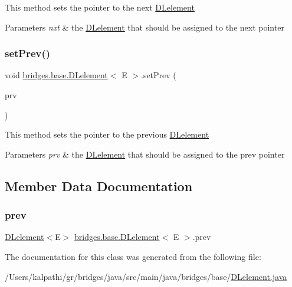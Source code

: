 This method sets the pointer to the next \mbox{\hyperlink{classbridges_1_1base_1_1_d_lelement}{D\+Lelement}}


\begin{DoxyParams}{Parameters}
{\em nxt} & the \mbox{\hyperlink{classbridges_1_1base_1_1_d_lelement}{D\+Lelement}} that should be assigned to the next pointer \\
\hline
\end{DoxyParams}
\mbox{\label{classbridges_1_1base_1_1_d_lelement_a152a06add922290d48b2d4affc87d592}} 
\subsubsection{\texorpdfstring{setPrev()}{setPrev()}}
{\footnotesize\ttfamily void \mbox{\hyperlink{classbridges_1_1base_1_1_d_lelement}{bridges.\+base.\+D\+Lelement}}$<$ E $>$.set\+Prev (\begin{DoxyParamCaption}\item[{\mbox{\hyperlink{classbridges_1_1base_1_1_d_lelement}{D\+Lelement}}$<$ E $>$}]{prv }\end{DoxyParamCaption})}

This method sets the pointer to the previous \mbox{\hyperlink{classbridges_1_1base_1_1_d_lelement}{D\+Lelement}}


\begin{DoxyParams}{Parameters}
{\em prv} & the \mbox{\hyperlink{classbridges_1_1base_1_1_d_lelement}{D\+Lelement}} that should be assigned to the prev pointer \\
\hline
\end{DoxyParams}


\subsection{Member Data Documentation}
\mbox{\label{classbridges_1_1base_1_1_d_lelement_a6eba4876f820b75ac6bde01d7dea9da7}} 
\subsubsection{\texorpdfstring{prev}{prev}}
{\footnotesize\ttfamily \mbox{\hyperlink{classbridges_1_1base_1_1_d_lelement}{D\+Lelement}}$<$E$>$ \mbox{\hyperlink{classbridges_1_1base_1_1_d_lelement}{bridges.\+base.\+D\+Lelement}}$<$ E $>$.prev\hspace{0.3cm}{\ttfamily [protected]}}



The documentation for this class was generated from the following file\+:\begin{DoxyCompactItemize}
\item 
/\+Users/kalpathi/gr/bridges/java/src/main/java/bridges/base/\mbox{\hyperlink{_d_lelement_8java}{D\+Lelement.\+java}}\end{DoxyCompactItemize}
